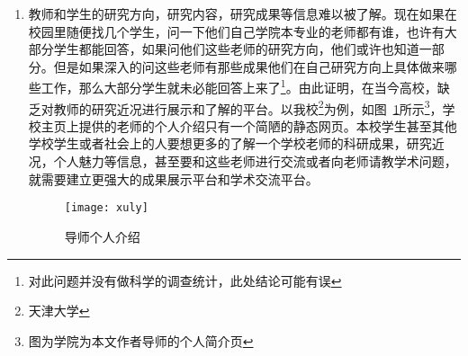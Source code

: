 \begin{enumerate}
\item 教师和学生的研究方向，研究内容，研究成果等信息难以被了解。现在如果在校园里随便找几个学生，问一下他们自己学院本专业的老师都有谁，也许有大部分学生都能回答，如果问他们这些老师的研究方向，他们或许也知道一部分。但是如果深入的问这些老师有那些成果他们在自己研究方向上具体做来哪些工作，那么大部分学生就未必能回答上来了\footnote{对此问题并没有做科学的调查统计，此处结论可能有误}。由此证明，在当今高校，缺乏对教师的研究近况进行展示和了解的平台。以我校\footnote{天津大学}为例，如图~\ref{fig:xfig1}所示\footnote{图为学院为本文作者导师的个人简介页}，学校主页上提供的老师的个人介绍只有一个简陋的静态网页。本校学生甚至其他学校学生或者社会上的人要想更多的了解一个学校老师的科研成果，研究近况，个人魅力等信息，甚至要和这些老师进行交流或者向老师请教学术问题，就需要建立更强大的成果展示平台和学术交流平台。
\begin{figure}[H] 
  \centering
  \texttt{[image: xuly]}
  \caption{导师个人介绍}
  \label{fig:xfig1}
\end{figure}

\end{enumerate}